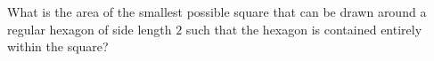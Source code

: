 What is the area of the smallest possible square that can be drawn around a regular hexagon of side length $2$ such that the hexagon is contained entirely within the square?